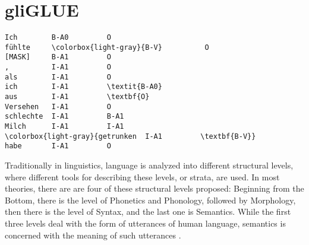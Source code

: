 
\label{chap:5_dataset}

\section{gliGLUE}


\begin{Verbatim}[commandchars=\\\{\}]
Ich        B-A0         O
fühlte     \colorbox{light-gray}{B-V}          O
[MASK]     B-A1         O
,          I-A1         O
als        I-A1         O
ich        I-A1         \textit{B-A0}
aus        I-A1         \textbf{O}
Versehen   I-A1         O
schlechte  I-A1         B-A1
Milch      I-A1         I-A1
\colorbox{light-gray}{getrunken  I-A1         \textbf{B-V}}
habe       I-A1         O
\end{Verbatim}


Traditionally in linguistics, language is analyzed into different structural levels, where
different tools for describing these levels, or strata, are used.
In most theories, there are are four of these structural levels proposed:
Beginning from the Bottom, there is the level of Phonetics and Phonology, followed by Morphology,
then there is the level of Syntax, and the last one is Semantics.
While the first three levels deal with the form of utterances of human language, semantics is
concerned with the meaning of such utterances \citep[p.~4ff.]{kracht2007introduction}.




